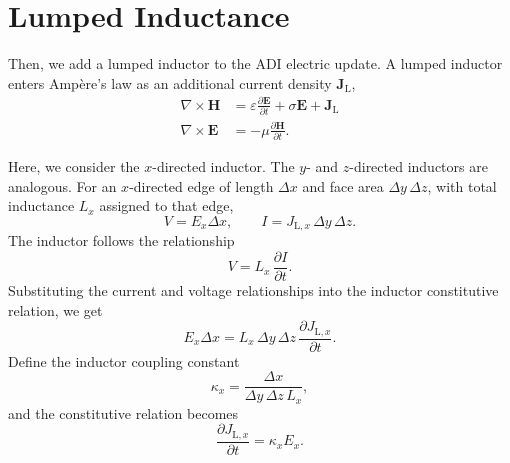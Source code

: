 \documentclass{article}
\numberwithin{equation}{section}
\numberwithin{figure}{section}
\begin{document}
\section{Lumped Inductance}

Then, we add a lumped inductor to the ADI electric update. A lumped inductor enters Amp\`ere's law as an additional current density $\mathbf{J}_\mathrm{L}$,
\begin{subequations}\label{eq:maxwell-inductor}
    \begin{align}
        \nabla \times \mathbf{H} & = \varepsilon \frac{\partial \mathbf{E}}{\partial t} + \sigma \mathbf{E} + \mathbf{J}_\mathrm{L}
        \label{eq:maxwell-ampere-inductor}                                                                                          \\
        \nabla \times \mathbf{E} & = -\mu \frac{\partial \mathbf{H}}{\partial t}.
        \label{eq:maxwell-faraday-inductor}
    \end{align}
\end{subequations}

Here, we consider the $x$-directed inductor. The $y$- and $z$-directed inductors are analogous. For an $x$-directed edge of length $\Delta x$ and face area $\Delta y\,\Delta z$, with total inductance $L_x$ assigned to that edge,
\begin{equation}
    V = E_x\Delta x,
    \qquad
    I = J_{\mathrm{L},x}\,\Delta y\,\Delta z.
\end{equation}
The inductor follows the relationship
\begin{equation}
    V = L_x\,\frac{\partial I}{\partial t}.
\end{equation}
Substituting the current and voltage relationships into the inductor constitutive relation, we get
\begin{equation}\label{eq:inductor-constitutive}
    E_x\Delta x
    = L_x\,\Delta y\,\Delta z\,\frac{\partial J_{\mathrm{L},x}}{\partial t}.
\end{equation}
Define the inductor coupling constant
\begin{equation}\label{eq:inductor-coupling}
    \kappa_x = \frac{\Delta x}{\Delta y\,\Delta z\,L_x},
\end{equation}
and the constitutive relation becomes
\begin{equation}\label{eq:inductor-kappa}
    \frac{\partial J_{\mathrm{L},x}}{\partial t} = \kappa_x E_x.
\end{equation}
\end{document}

